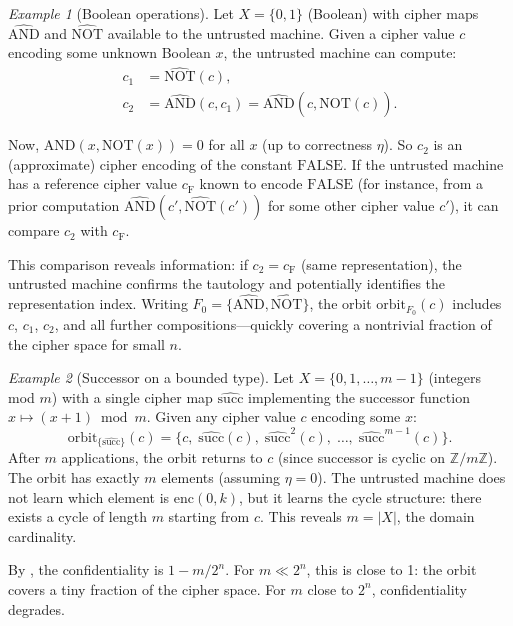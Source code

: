 \documentclass[11pt]{article}
\theoremstyle{definition}
\theoremstyle{plain}
\theoremstyle{remark}
\newtheorem{example}{Example}[section]
\newcommand{\enc}{\mathrm{enc}}
\begin{document}
\begin{example}[Boolean operations]
\label{ex:boolean-orbit}
Let $X = \{0, 1\}$ (Boolean) with cipher maps $\widehat{\mathrm{AND}}$ and
$\widehat{\mathrm{NOT}}$ available to the untrusted machine.
Given a cipher value $c$ encoding some unknown Boolean $x$, the untrusted
machine can compute:
\begin{align*}
c_1 &= \widehat{\mathrm{NOT}}(c), \\
c_2 &= \widehat{\mathrm{AND}}(c, c_1)
     = \widehat{\mathrm{AND}}(c, \widehat{\mathrm{NOT}}(c)).
\end{align*}

Now, $\mathrm{AND}(x, \mathrm{NOT}(x)) = 0$ for all $x$ (up to
correctness $\eta$).
So $c_2$ is an (approximate) cipher encoding of the constant
$\mathrm{FALSE}$.
If the untrusted machine has a reference cipher value $c_{\mathrm{F}}$
known to encode $\mathrm{FALSE}$ (for instance, from a prior computation
$\widehat{\mathrm{AND}}(c', \widehat{\mathrm{NOT}}(c'))$ for some other
cipher value $c'$), it can compare $c_2$ with $c_{\mathrm{F}}$.

This comparison reveals information: if $c_2 = c_{\mathrm{F}}$
(same representation), the untrusted machine confirms the tautology
and potentially identifies the representation index.
Writing $F_0 = \{\widehat{\mathrm{AND}}, \widehat{\mathrm{NOT}}\}$, the
orbit $\mathrm{orbit}_{F_0}(c)$ includes $c$, $c_1$, $c_2$, and all further
compositions---quickly covering a nontrivial fraction of the cipher space
for small $n$.
\end{example}

\begin{example}[Successor on a bounded type]
\label{ex:successor-orbit}
Let $X = \{0, 1, \ldots, m-1\}$ (integers mod $m$) with a single cipher
map $\widehat{\mathrm{succ}}$ implementing the successor function
$x \mapsto (x+1) \bmod m$.
Given any cipher value $c$ encoding some $x$:
\[
\mathrm{orbit}_{\{\widehat{\mathrm{succ}}\}}(c) =
  \{c,\; \widehat{\mathrm{succ}}(c),\;
   \widehat{\mathrm{succ}}^2(c),\; \ldots,\;
   \widehat{\mathrm{succ}}^{m-1}(c)\}.
\]
After $m$ applications, the orbit returns to $c$ (since successor is
cyclic on $\mathbb{Z}/m\mathbb{Z}$).
The orbit has exactly $m$ elements (assuming $\eta = 0$).
The untrusted machine does not learn which element is
$\enc(0, k)$, but it learns the cycle structure: there exists a cycle of
length $m$ starting from $c$.
This reveals $m = |X|$, the domain cardinality.

By , the confidentiality is
$1 - m/2^n$.
For $m \ll 2^n$, this is close to 1: the orbit covers a tiny fraction
of the cipher space.
For $m$ close to $2^n$, confidentiality degrades.
\end{example}
\end{document}
